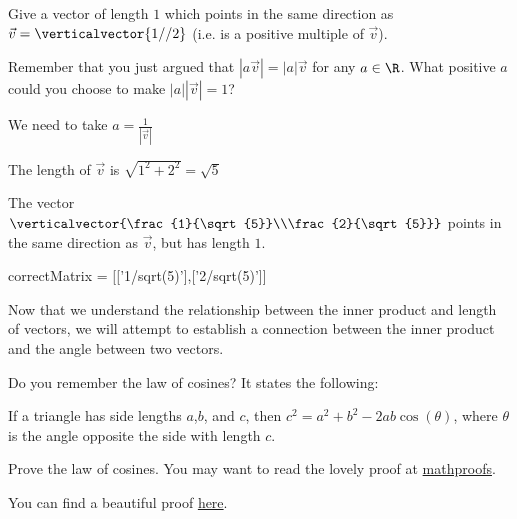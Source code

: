 \documentclass{ximera}
\begin{document}
\begin{question}
  Give a vector of length $1$ which points in the same direction as $\vec{v} = \verticalvector{1//2}$ (i.e. is a positive multiple of $\vec{v}$). 
  \begin{solution}
    
    \begin{hint}
      Remember that you just argued that $|a\vec{v}| =|a|\vec{v}$ for any $a\in \R$.  What positive $a$ could you choose to make $|a||\vec{v}| = 1$?
    \end{hint}
    \begin{hint}
      We need to take $a = \frac{1}{|\vec{v}|}$
    \end{hint}
    \begin{hint}
      The length of $\vec{v}$ is $\sqrt{1^2+2^2} = \sqrt{5}$
    \end{hint}
    \begin{hint}
      The vector $\verticalvector{\frac{1}{\sqrt{5}}\\\frac{2}{\sqrt{5}}}$ points in the same direction as $\vec{v}$, but has length $1$.
    \end{hint}
    \begin{matrix-answer}
      correctMatrix = [['1/sqrt(5)'],['2/sqrt(5)']]
    \end{matrix-answer}
  \end{solution}
\end{question}	

Now that we understand the relationship between the inner product and
length of vectors, we will attempt to establish a connection between
the inner product and the angle between two vectors.

Do you remember the law of cosines?  It states the following:

\begin{theorem}
  If a triangle has side lengths $a$,$b$, and $c$, then $c^2 = a^2+b^2 - 2ab\cos(\theta)$, where $\theta$ is the angle opposite the side with length $c$.
\end{theorem}

Prove the law of cosines.  You may want to read the lovely proof at \href{http://mathproofs.blogspot.com/2006/06/law-of-cosines.html}{mathproofs}.
\begin{free-response}
  You can find a beautiful proof \href{http://mathproofs.blogspot.com/2006/06/law-of-cosines.html}{here}.
\end{free-response}
\end{document}
